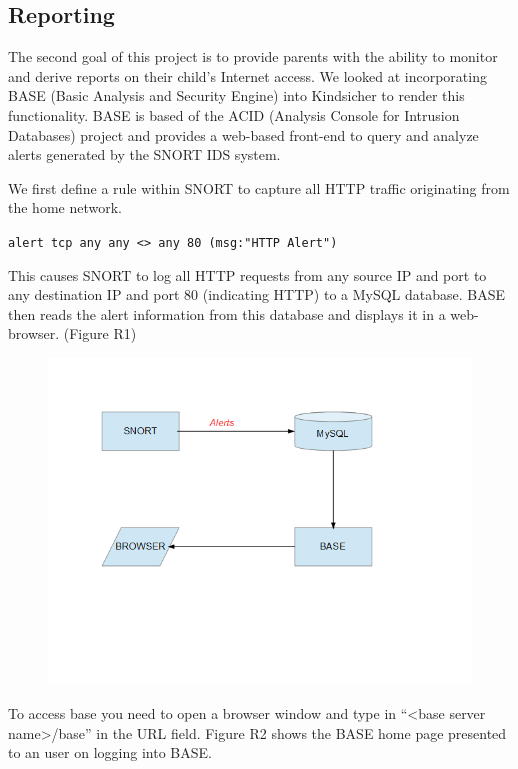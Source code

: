\subsection{Reporting}

The second goal of this project is to provide parents with the ability to
monitor and derive reports on their child's Internet access. 
%
We looked at incorporating BASE (Basic Analysis and Security Engine) into Kindsicher to
render this functionality. 
%
BASE is based of the ACID (Analysis Console for Intrusion Databases) project
and provides a web-based front-end to query and analyze alerts generated by
the SNORT IDS system.

We first define a rule within SNORT to capture all HTTP traffic originating
from the home network.  

\verb+alert tcp any any <> any 80 (msg:"HTTP Alert")+ 

This causes SNORT to log all HTTP requests from any source IP and port to any
destination IP and port 80 (indicating HTTP) to a MySQL database. 
%
BASE then reads the alert information from this database and displays it in a
web-browser. (Figure R1)

\begin{figure}
\includegraphics{figures/R1_BASE_Flow}
\end{figure}


To access base you need to open a browser window and type in “<base server
name>/base” in the URL field.
%
Figure R2 shows the BASE home page presented to an user on logging into BASE.
